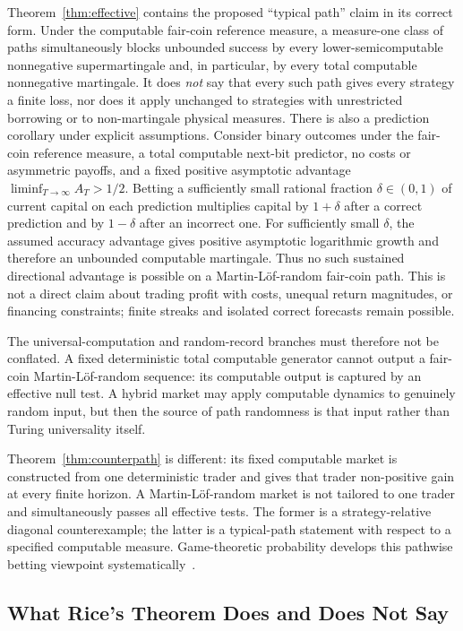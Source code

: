 \documentclass[aps,pra,reprint,superscriptaddress,amsmath,amssymb,floatfix]{revtex4-2}
\theoremstyle{plain}
\theoremstyle{definition}
\theoremstyle{remark}
\begin{document}
Theorem~\ref{thm:effective} contains the proposed ``typical path'' claim in its
correct form. Under the computable fair-coin reference measure, a measure-one
class of paths
simultaneously blocks unbounded success by every lower-semicomputable
nonnegative supermartingale and, in particular, by every total computable
nonnegative martingale. It does \emph{not} say that every such path gives every
strategy a finite loss, nor does it apply unchanged to strategies with
unrestricted borrowing or to non-martingale physical measures.
There is also a prediction corollary under explicit assumptions. Consider
binary outcomes under the fair-coin reference measure, a total computable
next-bit predictor, no costs or asymmetric payoffs, and a fixed positive
asymptotic advantage \(\liminf_{T\to\infty}A_T>1/2\). Betting a sufficiently
small rational fraction \(\delta\in(0,1)\) of current capital on each
prediction multiplies capital by \(1+\delta\) after a correct prediction and
by \(1-\delta\) after an incorrect one. For sufficiently small \(\delta\), the
assumed accuracy advantage gives positive asymptotic logarithmic growth and
therefore an unbounded computable martingale. Thus no such sustained
directional advantage is possible on a Martin-L\"of-random fair-coin path.
This is not a direct claim about trading profit with costs, unequal return
magnitudes, or financing constraints; finite streaks and isolated correct
forecasts remain possible.

The universal-computation and random-record branches must therefore not be
conflated. A fixed deterministic total computable generator cannot output a
fair-coin Martin-L\"of-random sequence: its computable output is captured by an
effective null test. A hybrid market may apply computable dynamics to genuinely
random input, but then the source of path randomness is that input rather than
Turing universality itself.

Theorem~\ref{thm:counterpath} is different: its fixed computable market is
constructed from one deterministic trader and gives that trader non-positive
gain at every finite horizon. A Martin-L\"of-random market is not tailored to
one trader and simultaneously passes all effective tests. The former is a
strategy-relative diagonal counterexample; the latter is a typical-path
statement with respect to a specified computable measure. Game-theoretic
probability develops this pathwise betting viewpoint
systematically~\cite{ShaferVovk2001}.

\subsection{What Rice's Theorem Does and Does Not Say}
\end{document}
